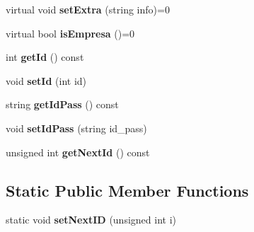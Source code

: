 \begin{DoxyCompactItemize}
\item 
\hypertarget{class_developer_affa6ed0c90caf781a20d6fb32940f092}{virtual void {\bfseries set\+Extra} (string info)=0}\label{class_developer_affa6ed0c90caf781a20d6fb32940f092}

\item 
\hypertarget{class_developer_aa77ea0a6dd6234c5d724c28c1971aa4e}{virtual bool {\bfseries is\+Empresa} ()=0}\label{class_developer_aa77ea0a6dd6234c5d724c28c1971aa4e}

\item 
\hypertarget{class_developer_a62488b1ca4ddd82fc0797d3de0123bde}{int {\bfseries get\+Id} () const }\label{class_developer_a62488b1ca4ddd82fc0797d3de0123bde}

\item 
\hypertarget{class_developer_aa84da30abf0b1db518d62825f407c520}{void {\bfseries set\+Id} (int id)}\label{class_developer_aa84da30abf0b1db518d62825f407c520}

\item 
\hypertarget{class_developer_a8e5fdafcd4f78c1ea913e2dc09086caa}{string {\bfseries get\+Id\+Pass} () const }\label{class_developer_a8e5fdafcd4f78c1ea913e2dc09086caa}

\item 
\hypertarget{class_developer_ad1a95c48872bc06136dd787cdc39e6fe}{void {\bfseries set\+Id\+Pass} (string id\+\_\+pass)}\label{class_developer_ad1a95c48872bc06136dd787cdc39e6fe}

\item 
\hypertarget{class_developer_a89801e2863c0548f539beb3077e4f6fc}{unsigned int {\bfseries get\+Next\+Id} () const }\label{class_developer_a89801e2863c0548f539beb3077e4f6fc}

\end{DoxyCompactItemize}
\subsection*{Static Public Member Functions}
\begin{DoxyCompactItemize}
\item 
\hypertarget{class_developer_abc49de08222dae89d042daeff3ad8098}{static void {\bfseries set\+Next\+I\+D} (unsigned int i)}\label{class_developer_abc49de08222dae89d042daeff3ad8098}

\end{DoxyCompactItemize}
